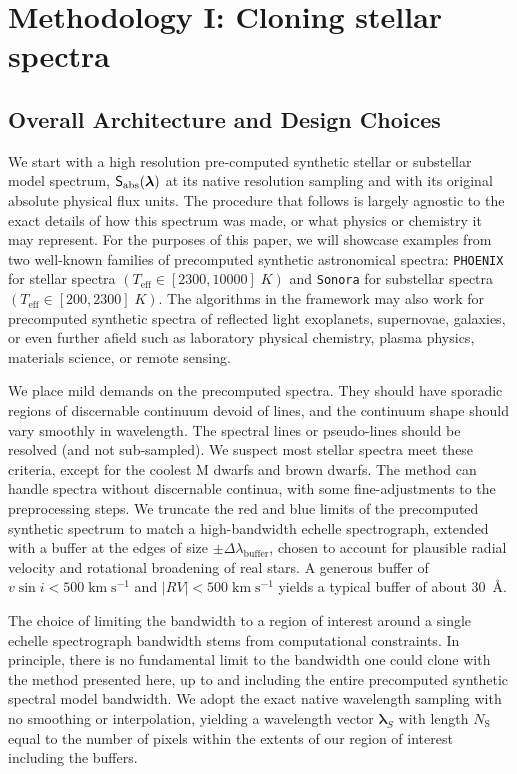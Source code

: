 \documentclass[twocolumn]{aastex631}
\def\kmps{\mathrm{km}\;\mathrm{s}^{-1}}
\begin{document}
\section{Methodology I: Cloning stellar spectra}\label{methodology}

\subsection{Overall Architecture and Design Choices}

We start with a high resolution pre-computed synthetic stellar or substellar model spectrum, $\mathsf{S}_{\rm abs}(\bm{\lambda})$ at its native resolution sampling and with its original absolute physical flux units. The procedure that follows is largely agnostic to the exact details of how this spectrum was made, or what physics or chemistry it may represent. For the purposes of this paper, we will showcase examples from two well-known families of precomputed synthetic astronomical spectra: \texttt{PHOENIX} \citep{husser13} for stellar spectra $(T_{\mathrm{eff}}\in [2300, 10000]\;K)$ and \texttt{Sonora} \citep{2021ApJ...920...85M} for substellar spectra $(T_{\mathrm{eff}}\in [200, 2300]\;K)$. The algorithms in the framework may also work for precomputed synthetic spectra of reflected light exoplanets, supernovae, galaxies, or even further afield such as laboratory physical chemistry, plasma physics, materials science, or remote sensing.

We place mild demands on the precomputed spectra. They should have sporadic regions of discernable continuum devoid of lines, and the continuum shape should vary smoothly in wavelength. The spectral lines or pseudo-lines should be resolved (and not sub-sampled). We suspect most stellar spectra meet these criteria, except for the coolest M dwarfs and brown dwarfs. The method can handle spectra without discernable continua, with some fine-adjustments to the preprocessing steps. We truncate the red and blue limits of the precomputed synthetic spectrum to match a high-bandwidth echelle spectrograph, extended with a buffer at the edges of size $\pm \Delta \lambda_{\mathrm{buffer}}$, chosen to account for plausible radial velocity and rotational broadening of real stars. A generous buffer of $v \sin{i} < 500 \;\kmps$ and $|RV|<500 \;\kmps$ yields a typical buffer of about 30~\AA.

The choice of limiting the bandwidth to a region of interest around a single echelle spectrograph bandwidth stems from computational constraints. In principle, there is no fundamental limit to the bandwidth one could clone with the method presented here, up to and including the entire precomputed synthetic spectral model bandwidth. We adopt the exact native wavelength sampling with no smoothing or interpolation, yielding a wavelength vector $\bm{\lambda}_S$ with length $N_\mathrm{S}$ equal to the number of pixels within the extents of our region of interest including the buffers.
\end{document}
